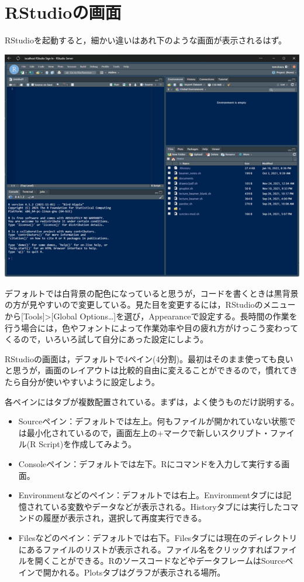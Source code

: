 \documentclass[
]{book}
\providecommand{\tightlist}{%
  \setlength{\itemsep}{0pt}\setlength{\parskip}{0pt}}
\begin{document}
\hypertarget{rstudioux306eux753bux9762}{%
\section{RStudioの画面}\label{rstudioux306eux753bux9762}}

RStudioを起動すると，細かい違いはあれ下のような画面が表示されるはず。

\includegraphics{RStudio.png}

デフォルトでは白背景の配色になっていると思うが，コードを書くときは黒背景の方が見やすいので変更している。見た目を変更するには，RStudioのメニューから{[}Tools{]}\textgreater{[}Global Options\ldots{]}を選び，Appearanceで設定する。長時間の作業を行う場合には，色やフォントによって作業効率や目の疲れ方がけっこう変わってくるので，いろいろ試して自分にあった設定にしよう。

RStudioの画面は，デフォルトで4ペイン(4分割)。最初はそのまま使っても良いと思うが，画面のレイアウトは比較的自由に変えることができるので，慣れてきたら自分が使いやすいように設定しよう。

各ペインにはタブが複数配置されている。まずは，よく使うものだけ説明する。

\begin{itemize}
\tightlist
\item
  Sourceペイン：デフォルトでは左上。何もファイルが開かれていない状態では最小化されているので，画面左上の+マークで新しいスクリプト・ファイル(R Script)を作成してみよう。
\item
  Consoleペイン：デフォルトでは左下。Rにコマンドを入力して実行する画面。
\item
  Environmentなどのペイン：デフォルトでは右上。Environmentタブには記憶されている変数やデータなどが表示される。Historyタブには実行したコマンドの履歴が表示され，選択して再度実行できる。
\item
  Filesなどのペイン：デフォルトでは右下。Filesタブには現在のディレクトリにあるファイルのリストが表示される。ファイル名をクリックすればファイルを開くことができる。RのソースコードなどやデータフレームはSourceペインで開かれる。Plotsタブはグラフが表示される場所。
\end{itemize}
\end{document}
